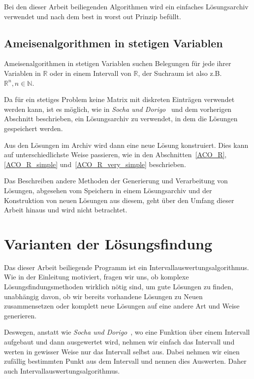 \documentclass[fontsize=12, a4aper]{scrartcl}
\begin{document}
	Bei den dieser Arbeit beiliegenden Algorithmen wird ein einfaches Lösungsarchiv verwendet und nach dem \glqq best in worst out\grqq \hspace{.16667em} Prinzip befüllt.
	
	\subsection{Ameisenalgorithmen in stetigen Variablen}
	
	Ameisenalgorithmen in stetigen Variablen suchen Belegungen für jede ihrer Variablen in \(\mathbb{R}\) oder in einem Intervall von \(\mathbb{R}\), der Suchraum ist also z.B. \(\mathbb{R}^n, n \in \mathbb{N}\).\hfill\newline
	
	Da für ein stetiges Problem keine Matrix mit diskreten Einträgen verwendet werden kann, ist es möglich, wie in \textit{Socha und Dorigo}~\cite{socha2008ant} und dem vorherigen Abschnitt beschrieben, ein Lösungsarchiv zu verwendet, in dem die Lösungen gespeichert werden.
	\hfill\newline
	
	Aus den Lösungen im Archiv wird dann eine neue Lösung konstruiert. Dies kann auf unterschiedlichste Weise passieren, wie in den Abschnitten~\ref{ACO_R}, \ref{ACO_R_simple} und~\ref{ACO_R_very_simple} beschrieben.\hfill\newline
	
	Das Beschreiben andere Methoden der Generierung und Verarbeitung von Lösungen, abgesehen vom Speichern in einem Lösungsarchiv und der Konstruktion von neuen Lösungen aus diesem, geht über den Umfang dieser Arbeit hinaus und wird nicht betrachtet.
	
	\section{Varianten der Lösungsfindung}
	
	Das dieser Arbeit beiliegende Programm ist ein Intervallauswertungsalgorithmus. Wie in der Einleitung motiviert, fragen wir uns, ob komplexe Lösungsfindungsmethoden wirklich nötig sind, um gute Lösungen zu finden, unabhängig davon, ob wir bereits vorhandene Lösungen zu Neuen zusammensetzen oder komplett neue Lösungen auf eine andere Art und Weise generieren.\hfill\newline
	
	Deswegen, anstatt wie \textit{Socha und Dorigo}~\cite{socha2008ant}, wo eine Funktion über einem Intervall aufgebaut und dann ausgewertet wird, nehmen wir einfach das Intervall und werten in gewisser Weise nur das Intervall selbst aus. Dabei nehmen wir einen zufällig bestimmten Punkt aus dem Intervall und nennen dies Auswerten. Daher auch Intervallauswertungsalgorithmus.\hfill\newline
	
\end{document}
